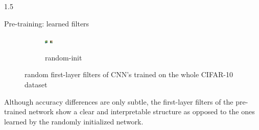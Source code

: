 \documentclass[final]{beamer}
\newlength{\onecolwid}
\newlength{\threecolwid}
\begin{document}
\begin{frame}[t]
\begin{columns}[t]
\begin{column}{\threecolwid}
\begin{columns}[t, totalwidth=\threecolwid]
\begin{column}{1.5\onecolwid}
\begin{block}{Pre-training: learned filters}
\begin{figure}
\begin{subfigure}{.4\linewidth}
				\includegraphics[width=0.1\linewidth]{graphics/cifar_filters/random_17.png} %
				\includegraphics[width=0.1\linewidth]{graphics/cifar_filters/random_18.png}
				\caption{random-init}
			\end{subfigure}

			\caption{random first-layer filters of CNN's trained on the whole CIFAR-10 dataset}

		\end{figure}

		Although accuracy differences are only subtle, the first-layer filters of the pre-trained network show a clear and interpretable structure as opposed to the ones learned by the randomly initialized network.

	\end{block}

\end{column}

\end{columns}




\end{column}
\end{columns} %

\end{frame} %
\end{document}
